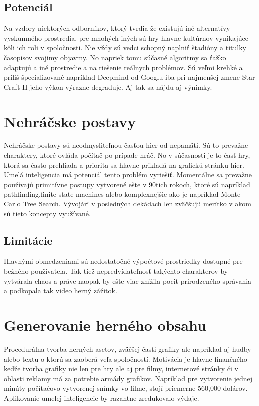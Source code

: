 \documentclass{article}
\begin{document}
\subsection{Potenciál}

Na vzdory niektorých odborníkov, ktorý tvrdia že existujú iné alternatívy vyskumného prostredia, pre mnohých iných sú hry hlavne kultúrnov vynikajúce kôli ich roli v spoločnosti. Nie vždy sú vedci schopný naplniť štadióny a titulky časopisov svojimy objavmy. No napriek tomu súčasné algoritmy sa ťažko adaptujú a iné prostredie a na riešenie reálnych problémov. Sú veľmi krehké a príliš špecializované napríklad Deepmind od Googlu iba pri najmenšej zmene Star Craft II jeho výkon výrazne degraduje. Aj tak sa nájdu aj výnimky. 
\section{Nehráčske postavy}

Nehráčske postavy sú neodmysliteľnou časťou hier od nepamäti. Sú to prevažne charaktery, ktoré ovláda počítač po prípade hráč. No v súčasnosti je to časť hry, ktorá sa často prehliada a priorita sa hlavne prikladá na grafickú stránku hier. Umelá inteligencia má potenciál tento problém vyriešiť. Momentálne sa prevažne používajú primitívne postupy vytvorené ešte v 90tich rokoch, ktoré sú napríklad pathfinding,finite state machines alebo komplexnejšie ako je napríklad Monte Carlo Tree Search\cite{nickstatt}. Vývojári v posledných dekádach len zväčšujú merítko v akom sú tieto koncepty využívané.

\subsection{Limitácie}

Hlavnými obmedzeniami sú nedostatočné výpočtové prostriedky dostupné pre bežného používateľa. Tak tiež nepredvídateľnosť takýchto charakterov by vytvárala chaos a práve naopak by ešte viac znížila pocit prirodzeného správania a podkopala tak video herný zážitok\cite{phdthesis}.

\section{Generovanie herného obsahu}
Procedurálna tvorba herných asetov, zväčšej časti grafiky ale napríklad aj hudby alebo textu o ktorú sa zaoberá veľa spoločností. Motivácia je hlavne finančného keďže tvorba grafiky nie len pre hry ale aj pre filmy, internetové stránky či v oblasti reklamy má za potrebie armády grafikov. Napríklad pre vytvorenie jednej minúty počítačovo vytvorenej snímky vo filme, stojí priemerne 560,000 dolárov. Aplikovanie umelej inteligencie by razantne zredukovalo výdaje.
\end{document}
